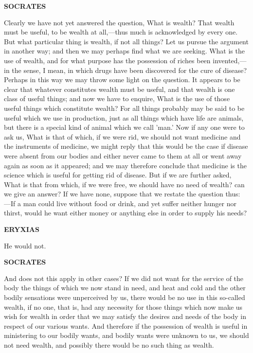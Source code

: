 \documentclass[11pt,letter]{article}
\begin{document}
\par \textbf{SOCRATES}
\par   Clearly we have not yet answered the question, What is wealth? That wealth must be useful, to be wealth at all,—thus much is acknowledged by every one. But what particular thing is wealth, if not all things? Let us pursue the argument in another way; and then we may perhaps find what we are seeking. What is the use of wealth, and for what purpose has the possession of riches been invented,—in the sense, I mean, in which drugs have been discovered for the cure of disease? Perhaps in this way we may throw some light on the question. It appears to be clear that whatever constitutes wealth must be useful, and that wealth is one class of useful things; and now we have to enquire, What is the use of those useful things which constitute wealth? For all things probably may be said to be useful which we use in production, just as all things which have life are animals, but there is a special kind of animal which we call 'man.' Now if any one were to ask us, What is that of which, if we were rid, we should not want medicine and the instruments of medicine, we might reply that this would be the case if disease were absent from our bodies and either never came to them at all or went away again as soon as it appeared; and we may therefore conclude that medicine is the science which is useful for getting rid of disease. But if we are further asked, What is that from which, if we were free, we should have no need of wealth? can we give an answer? If we have none, suppose that we restate the question thus: —If a man could live without food or drink, and yet suffer neither hunger nor thirst, would he want either money or anything else in order to supply his needs?

\par \textbf{ERYXIAS}
\par   He would not.

\par \textbf{SOCRATES}
\par   And does not this apply in other cases? If we did not want for the service of the body the things of which we now stand in need, and heat and cold and the other bodily sensations were unperceived by us, there would be no use in this so-called wealth, if no one, that is, had any necessity for those things which now make us wish for wealth in order that we may satisfy the desires and needs of the body in respect of our various wants. And therefore if the possession of wealth is useful in ministering to our bodily wants, and bodily wants were unknown to us, we should not need wealth, and possibly there would be no such thing as wealth.
\end{document}

